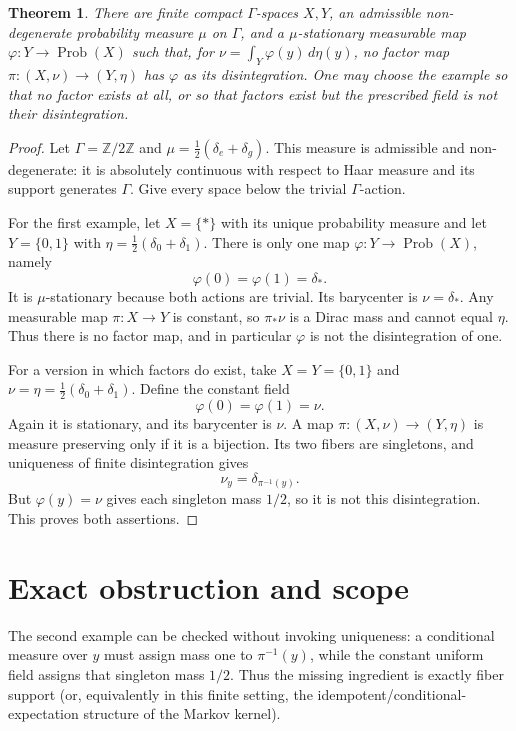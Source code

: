 \documentclass[11pt]{article}
\newtheorem{theorem}{Theorem}
\newcommand{\Prob}{\operatorname{Prob}}
\begin{document}
\begin{theorem}\label{thm:main}
There are finite compact $\Gamma$-spaces $X,Y$, an admissible non-degenerate
probability measure $\mu$ on $\Gamma$, and a $\mu$-stationary measurable map
$\varphi:Y\to\Prob(X)$ such that, for
$\nu=\int_Y\varphi(y)\,d\eta(y)$, no factor map
$\pi:(X,\nu)\to(Y,\eta)$ has $\varphi$ as its disintegration.  One may
choose the example so that no factor exists at all, or so that factors exist
but the prescribed field is not their disintegration.
\end{theorem}

\begin{proof}
Let $\Gamma=\mathbb Z/2\mathbb Z$ and
$\mu=\tfrac12(\delta_e+\delta_g)$.  This measure is admissible and
non-degenerate: it is absolutely continuous with respect to Haar measure and
its support generates $\Gamma$.  Give every space below the trivial
$\Gamma$-action.

For the first example, let $X=\{*\}$ with its unique probability measure and
let $Y=\{0,1\}$ with
$\eta=\tfrac12(\delta_0+\delta_1)$.  There is only one map
$\varphi:Y\to\Prob(X)$, namely
\[
 \varphi(0)=\varphi(1)=\delta_*.
\]
It is $\mu$-stationary because both actions are trivial.  Its barycenter is
$\nu=\delta_*$.  Any measurable map $\pi:X\to Y$ is constant, so
$\pi_*\nu$ is a Dirac mass and cannot equal $\eta$.  Thus there is no factor
map, and in particular $\varphi$ is not the disintegration of one.

For a version in which factors do exist, take
$X=Y=\{0,1\}$ and $\nu=\eta=\tfrac12(\delta_0+\delta_1)$.  Define the
constant field
\[
 \varphi(0)=\varphi(1)=\nu.
\]
Again it is stationary, and its barycenter is $\nu$.  A map
$\pi:(X,\nu)\to(Y,\eta)$ is measure preserving only if it is a bijection.
Its two fibers are singletons, and uniqueness of finite disintegration gives
\[
 \nu_y=\delta_{\pi^{-1}(y)}.
\]
But $\varphi(y)=\nu$ gives each singleton mass $1/2$, so it is not this
disintegration.  This proves both assertions.
\end{proof}

\section{Exact obstruction and scope}

The second example can be checked without invoking uniqueness: a conditional
measure over $y$ must assign mass one to $\pi^{-1}(y)$, while the constant
uniform field assigns that singleton mass $1/2$.  Thus the missing ingredient
is exactly fiber support (or, equivalently in this finite setting, the
idempotent/conditional-expectation structure of the Markov kernel).
\end{document}
